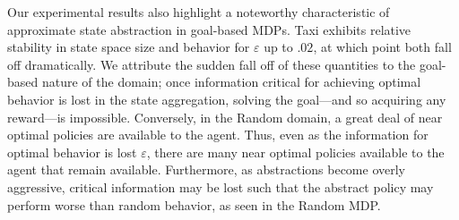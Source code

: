 Our experimental results also highlight a noteworthy characteristic of approximate state abstraction in goal-based \acp{MDP}. Taxi exhibits relative stability in state space size and behavior for $\varepsilon$ up to $.02$, at which point both fall off dramatically. We attribute the sudden fall off of these quantities to the goal-based nature of the domain; once information critical for achieving optimal behavior is lost in the state aggregation, solving the goal---and so acquiring any reward---is impossible. Conversely, in the Random domain, a great deal of near optimal policies are available to the agent. Thus, even as the information for optimal behavior is lost $\varepsilon$, there are many near optimal policies available to the agent that remain available. 
Furthermore, as abstractions become overly aggressive, critical information may be lost such that the abstract policy may perform worse than random behavior, as seen in the Random MDP.


